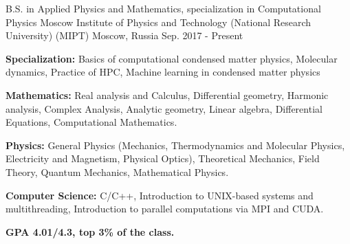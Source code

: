 

\begin{cventries}

  \cventry
    {B.S. in Applied Physics and Mathematics, specialization in Computational Physics} %
    {Moscow Institute of Physics and Technology (National Research University) (MIPT)} %
    {Moscow, Russia} %
    {Sep. 2017 - Present} %
    {
      \begin{cvitems} %
        \item {\textbf{Specialization:} Basics of computational condensed matter physics, Molecular dynamics, Practice of HPC, Machine learning in condensed matter physics}
        \item {\textbf{Mathematics:} Real analysis and Calculus, Differential geometry, Harmonic analysis, Complex Analysis, Analytic geometry, Linear algebra, Differential Equations, Computational Mathematics.}
        \item {\textbf{Physics:} General Physics (Mechanics, Thermodynamics and Molecular Physics, Electricity and Magnetism, Physical Optics), Theoretical Mechanics, Field Theory, Quantum Mechanics, Mathematical Physics.}
        \item {\textbf{Computer Science:}  C/C++, Introduction to UNIX-based systems and multithreading, Introduction to parallel computations via MPI and CUDA.
		\item {\textbf{GPA 4.01/4.3, top 3\% of the class.}}        
}
      \end{cvitems}
    }

\end{cventries}
